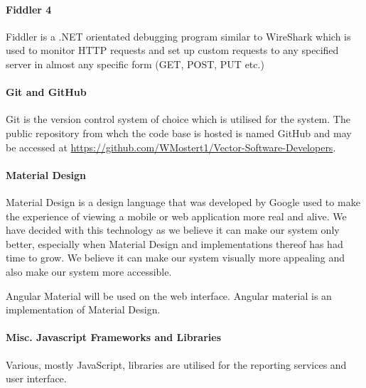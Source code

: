 \documentclass[11pt,a4paper,titlepage]{article}
\begin{document}
		\paragraph{Fiddler 4}
			Fiddler is a .NET orientated debugging program similar to WireShark which is used to monitor HTTP requests and set up custom requests to any specified server in almost any specific form (GET, POST, PUT etc.)
		\paragraph{Git and GitHub}
			Git is the version control system of choice which is utilised for the system. The public repository from whch the code base is hosted is named GitHub and may be accessed at \url{https://github.com/WMostert1/Vector-Software-Developers}.
		\paragraph{Material Design}
			Material Design is a design language that was developed by Google used to make the experience of viewing a mobile or web application more real and alive. We have decided with this technology as we believe it can make our system only better, especially when Material Design and implementations thereof has had time to grow. We believe it can make our system visually more appealing and also make our system more accessible.
			
			Angular Material will be used on the web interface. Angular material is an implementation of Material Design.  
		\paragraph{Misc. Javascript Frameworks and Libraries}
			Various, mostly JavaScript, libraries are utilised for the reporting services and user interface.


%  
\end{document}
